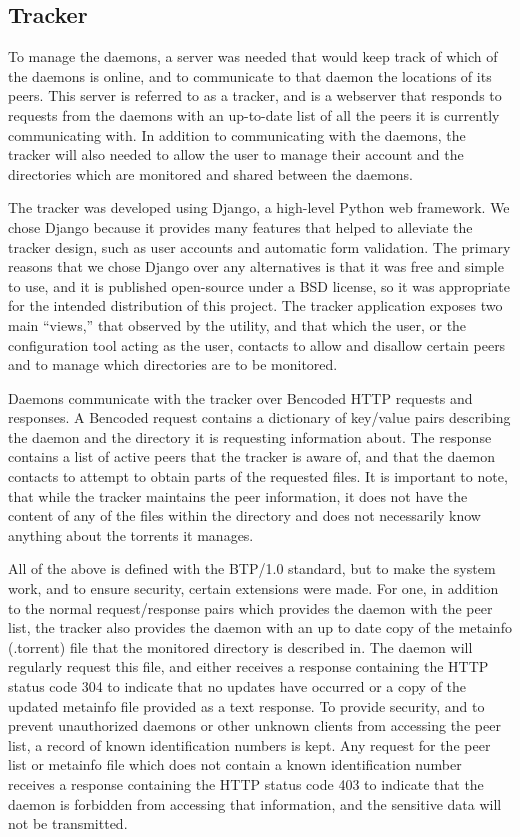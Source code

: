 \documentclass[12 pt]{article}
\begin{document}
	\subsection{Tracker}
	
	To manage the daemons, a server was needed that would keep track of which of the daemons is online, and to communicate to that daemon the locations of its peers. This server is referred to as a tracker, and is a webserver that responds to requests from the daemons with an up-to-date list of all the peers it is currently communicating with. In addition to communicating with the daemons, the tracker will also needed to allow the user to manage their account and the directories which are monitored and shared between the daemons.
	
	The tracker was developed using Django, a high-level Python web framework. We chose Django because it provides many features that helped to alleviate the tracker design, such as user accounts and automatic form validation. The primary reasons that we chose Django over any alternatives is that it was free and simple to use, and it is published open-source under a BSD license, so it was appropriate for the intended distribution of this project. The tracker application exposes two main ``views,'' that observed by the utility, and that which the user, or the configuration tool acting as the user, contacts to allow and disallow certain peers and to manage which directories are to be monitored. 
	
	Daemons communicate with the tracker over Bencoded HTTP requests and responses. A Bencoded request contains a dictionary of key/value pairs describing the daemon and the directory it is requesting information about. The response contains a list of active peers that the tracker is aware of, and that the daemon contacts to attempt to obtain parts of the requested files. It is important to note, that while the tracker maintains the peer information, it does not have the content of any of the files within the directory and does not necessarily know anything about the torrents it manages.
	
	All of the above is defined with the BTP/1.0 standard, but to make the system work, and to ensure security, certain extensions were made. For one, in addition to the normal request/response pairs which provides the daemon with the peer list, the tracker also provides the daemon with an up to date copy of the metainfo (.torrent) file that the monitored directory is described in. The daemon will regularly request this file, and either receives a response containing the HTTP status code 304 to indicate that no updates have occurred or a copy of the updated metainfo file provided as a text response. To provide security, and to prevent unauthorized daemons or other unknown clients from accessing the peer list, a record of known identification numbers is kept. Any request for the peer list or metainfo file which does not contain a known identification number receives a response containing the HTTP status code 403 to indicate that the daemon is forbidden from accessing that information, and the sensitive data will not be transmitted.
	
\end{document}
